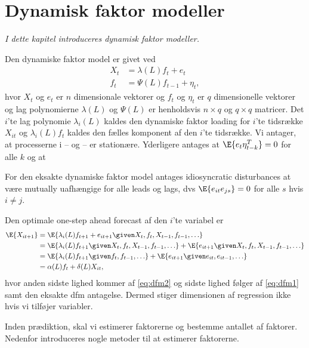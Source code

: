 \chapter{Dynamisk faktor modeller}
\textit{I dette kapitel introduceres dynamisk faktor modeller.}

Den dynamiske faktor model er givet ved
\begin{align}
X_t &= \lambda(L) f_t + e_t \label{eq:dfm1}\\
f_t &= \Psi(L) f_{t-1} + \eta_t, \label{eq:dfm2}
\end{align} 
hvor $X_t$ og $e_t$ er \(n\) dimensionale vektorer og $f_t$ og $\eta_t$ er \(q\) dimensionelle vektorer og lag polynomierne $\lambda(L)$ og $\Psi(L)$ er henholdsvis $n \times q$ og $q \times q$ matricer.
Det $i$'te lag polynomie $\lambda_i(L)$ kaldes den dynamiske faktor loading for $i$'te tidsrække $X_{it}$ og $\lambda_i(L) f_t$ kaldes den fælles komponent af den $i$'te tidsrække.
Vi antager, at processerne i -- og -- er stationære.
Yderligere antages at $\E{e_t \eta_{t-k}^T}=0$ for alle $k$ og at

For den eksakte dynamiske faktor model antages idiosyncratic disturbances at være mutually uafhængige for alle leads og lags, dvs $\E{e_{it} e_{js}}=0$ for alle $s$ hvis $i \neq j$.

Den optimale one-step ahead forecast af den $i$'te variabel er
\begin{align*}
\E{X_{it+1}} &= \E{\lambda_i(L)f_{t+1} + e_{it+1} \given X_t,f_t,X_{t-1},f_{t-1},\ldots} \\
&= \E{\lambda_i(L)f_{t+1} \given X_t,f_t,X_{t-1},f_{t-1},\ldots} + \E{e_{it+1} \given X_t,f_t,X_{t-1},f_{t-1},\ldots} \\
&= \E{\lambda_i(L)f_{t+1} \given f_t, f_{t-1}, \ldots} + \E{e_{it+1} \given e_{it}, e_{it-1}, \ldots} \\
&= \alpha(L) f_t + \delta(L) X_{it},
\end{align*}
hvor anden sidste lighed kommer af \eqref{eq:dfm2} og sidste lighed følger af \eqref{eq:dfm1} samt den eksakte dfm antagelse.
Dermed stiger dimensionen af regression ikke hvis vi tilføjer variabler.

Inden prædiktion, skal vi estimerer faktorerne og bestemme antallet af faktorer.
Nedenfor introduceres nogle metoder til at estimerer faktorerne.

